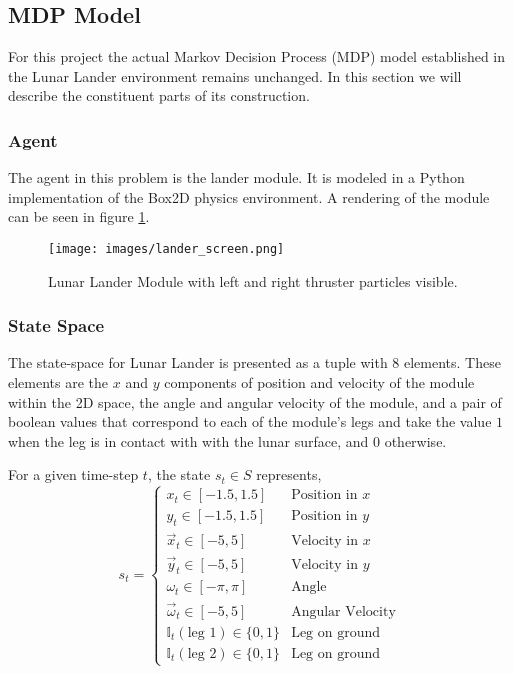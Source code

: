 \documentclass[journal]{IEEEtran}
\begin{document}
\subsection{MDP Model}
\label{sec:MDP Model}

For this project the actual Markov Decision Process (MDP) model established in the Lunar Lander
environment remains unchanged. In this section we will describe the constituent parts of its 
construction.

\subsubsection{Agent}
The agent in this problem is the lander module. It is modeled in a Python implementation of
the Box2D physics environment. A rendering of the module can be seen in figure \ref{fig:lander}.

\begin{figure}
    \center
    \texttt{[image: images/lander\_screen.png]}
    \caption{Lunar Lander Module with left and right thruster particles visible.}
    \label{fig:lander}
\end{figure}

\subsubsection{State Space}
The state-space for Lunar Lander is presented as a tuple with 8 elements.
These elements are the \(x\) and \(y\) components of position and velocity of the module within
the 2D space, the angle and angular velocity of the module, and a pair of boolean values that 
correspond to each of the module's legs and take the value \(1\) when the leg is in contact with
with the lunar surface, and \(0\) otherwise.

For a given time-step \(t\), the state \(s_t \in S\) represents,
\[s_t = \begin{cases}
    x_t \in [-1.5,1.5]   & \text{Position in } x \\
    y_t \in [-1.5,1.5]   & \text{Position in } y \\
    \vec{x}_t \in [-5,5] & \text{Velocity in } x \\
    \vec{y}_t \in [-5,5] & \text{Velocity in } y \\
    \omega_t \in [-\pi,\pi] & \text{Angle}\\
    \vec{\omega}_t \in [-5,5] & \text{Angular Velocity}\\
    \mathbb{I}_{t}(\text{leg 1}) \in\{0,1\} & \text{Leg on ground}\\
    \mathbb{I}_{t}(\text{leg 2}) \in\{0,1\} & \text{Leg on ground}
\end{cases}\]
\end{document}
